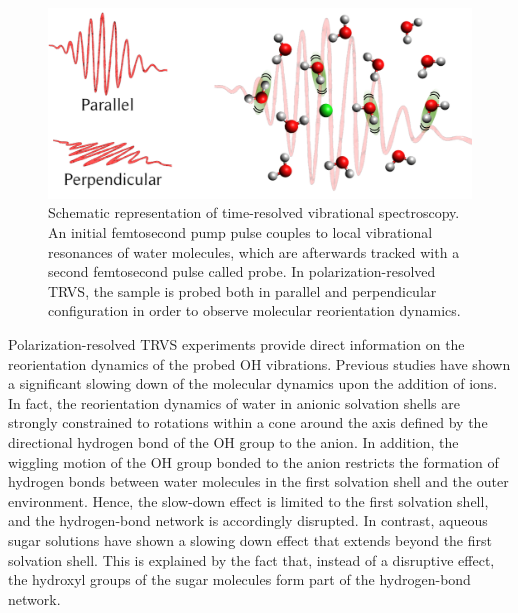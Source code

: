 \begin{figure}[t!]
	\centering
	\includegraphics[width=0.85\figwidth]{chapters/Chapter1_Introduction/Graphs/TRVS_Concept1.png} %
	\caption{Schematic representation of time-resolved vibrational spectroscopy. An initial femtosecond pump pulse couples to local vibrational resonances of water molecules, which are afterwards tracked with a second femtosecond pulse called probe. In polarization-resolved TRVS, the sample is probed both in parallel and perpendicular configuration in order to observe molecular reorientation dynamics.}
	\label{TRVSSchematic}
\end{figure}


Polarization-resolved TRVS experiments provide direct information on the reorientation dynamics of the probed OH vibrations. Previous studies have shown a significant slowing down of the molecular dynamics upon the addition of ions. In fact, the reorientation dynamics of water in anionic solvation shells are strongly constrained to rotations within a cone around the axis defined by the directional hydrogen bond of the OH group to the anion.\!\cite{vanderPost2012,vanderPost2012a,vanderPost2013} In addition, the wiggling motion of the OH group bonded to the anion restricts the formation of hydrogen bonds between water molecules in the first solvation shell and the outer environment. Hence, the slow-down effect is limited to the first solvation shell, and the hydrogen-bond network is accordingly disrupted.\!\cite{Marcus2009} In contrast, aqueous sugar solutions have shown a slowing down effect that extends beyond the first solvation shell. This is explained by the fact that, instead of a disruptive effect, the hydroxyl groups of the sugar molecules form part of the hydrogen-bond network.\!\cite{Groot2014,Groot2015}


